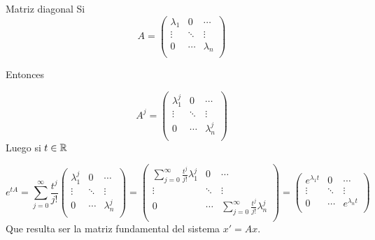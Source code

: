 \begin{ejemplo}{Matriz diagonal}  Si
 $$
 A=\begin{pmatrix}
\lambda_{1}&0 & \cdots \\
\vdots & \ddots& \vdots\\
0 &\cdots & \lambda_{n}\\
\end{pmatrix}
$$

Entonces 

 $$
 A^j=\begin{pmatrix}
\lambda^j_{1}&0 & \cdots \\
\vdots & \ddots& \vdots\\
0 &\cdots & \lambda^j_{n}\\
\end{pmatrix}
$$
Luego si $t\in\mathbb{R}$

 $$
 e^{tA}=\sum_{j=0}^{\infty}\frac{t^j}{j!}\begin{pmatrix}
\lambda^j_{1}&0 & \cdots \\
\vdots & \ddots& \vdots\\
0 &\cdots & \lambda^j_{n}\\
\end{pmatrix}=
\begin{pmatrix}
\sum_{j=0}^{\infty}\frac{t^j}{j!}\lambda^j_{1}&0 & \cdots \\
\vdots & \ddots& \vdots\\
0 &\cdots & \sum_{j=0}^{\infty}\frac{t^j}{j!}\lambda^j_{n}\\
\end{pmatrix}
=
\begin{pmatrix}
e^{\lambda_{1}t}&0 & \cdots \\
\vdots & \ddots& \vdots\\
0 &\cdots & e^{\lambda_n t}\\
\end{pmatrix}
$$
Que resulta ser la matriz fundamental del sistema $x'=Ax$.
\end{ejemplo}


